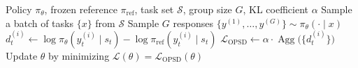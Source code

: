 \begin{algorithm}[t]
  \caption{OPSD}
  \label{alg:opsd}
  \begin{algorithmic}[1]
  \Require Policy $\pi_{\theta}$, frozen reference $\pi_{\mathrm{ref}}$, task set
  $\mathcal{S}$, group size $G$, KL coefficient $\alpha$
      \State Sample a batch of tasks $\{x\}$ from $\mathcal{S}$
          \State {}
          \State Sample $G$ responses $\{y^{(1)},\dots,y^{(G)}\} \sim \pi_{\theta}(\cdot \mid
  x)$
          \State {}
                  \State $d_t^{(i)} \gets \log\pi_{\theta}(y_t^{(i)} \mid s_t) -
  \log\pi_{\mathrm{ref}}(y_t^{(i)} \mid s_t)$
              \EndFor
          \EndFor
          \State $\mathcal{L}_{\mathrm{OPSD}} \gets
  \alpha \cdot \operatorname{Agg}\!\bigl(\{d_t^{(i)}\}\bigr)$
          \State {}
          \State Update $\theta$ by minimizing $\mathcal{L}(\theta) =
  \mathcal{L}_{\mathrm{OPSD}}(\theta)$
      \EndFor
  \EndFor
  \end{algorithmic}
\end{algorithm}

